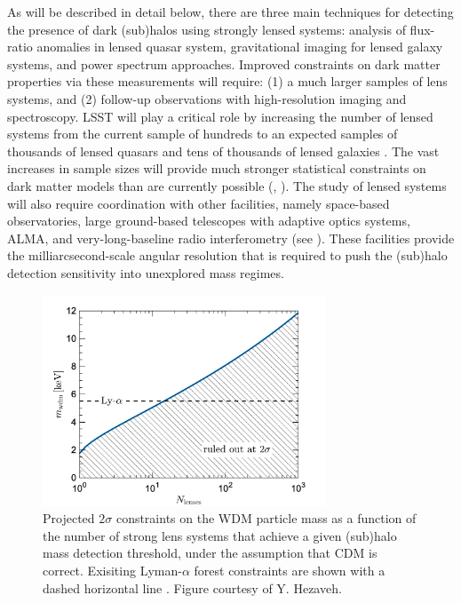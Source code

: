 As will be described in detail below, there are three main techniques for detecting the presence of dark (sub)halos using strongly lensed systems: analysis of flux-ratio anomalies in lensed quasar system,
gravitational imaging for lensed galaxy systems, and power spectrum approaches. 
Improved constraints on dark matter properties via these measurements will require: (1) a much larger samples of lens systems, and (2) follow-up observations with high-resolution imaging and spectroscopy.
LSST will play a critical role by increasing the number of lensed systems from the current sample of hundreds to an expected samples of thousands of lensed quasars \citep{O+M10} and tens of thousands of lensed galaxies \citep{Collett2015}.
The vast increases in sample sizes will provide much stronger statistical constraints on dark matter models than are currently possible (\eg, ).
The study of lensed systems will also require coordination with other facilities, namely space-based observatories, large ground-based telescopes with adaptive optics systems, ALMA, and very-long-baseline radio interferometry (see ). These facilities provide the milliarcsecond-scale angular resolution that is required to push the (sub)halo detection sensitivity into unexplored mass regimes.

\begin{figure}
    \centering
    \includegraphics[width=0.75\textwidth]{figures/wdm_constraints_yh.png}
    \caption{ \label{fig:lensing_wdmlim_vs_nlens} Projected $2\sigma$ constraints on the WDM particle mass as a function of the number of strong lens systems that achieve a given (sub)halo mass detection threshold, under the assumption that CDM is correct. Exisiting Lyman-$\alpha$ forest constraints are shown with a dashed horizontal line \citep{2017PhRvD..96b3522I}. Figure courtesy of Y. Hezaveh.
}
\end{figure}


